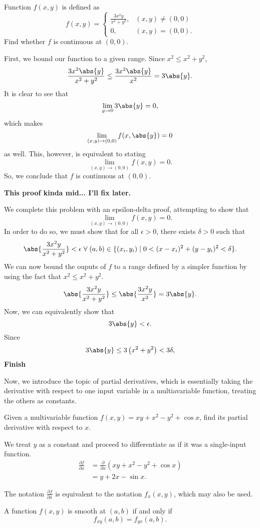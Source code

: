 \begin{example}
    Function $f(x, y)$ is defined as
    \[f(x, y) = \begin{cases}
        \frac{3x^{2}y}{x^{2} + y^{2}}, & (x, y) \neq (0, 0) \\
        0, & (x, y) = (0, 0).
    \end{cases}\]
    Find whether $f$ is continuous at $(0, 0)$.

    \begin{soln}
        First, we bound our function to a given range. Since $x^{2} \leq x^{2} + y^{2}$,
        \[\frac{3x^{2}\abs{y}}{x^{2} + y^{2}} \leq \frac{3x^{2}\abs{y}}{x^{2}} = 3\abs{y}.\]
        It is clear to see that
        \[\lim_{y \to 0} 3\abs{y} = 0,\]
        which makes
        \[\lim_{(x, y) \to (0, 0)} f(x, \abs{y}) = 0\]
        as well. This, however, is equivalent to stating
        \[\lim_{(x, y) \to (0, 0)} f(x, y) = 0.\]
        So, we conclude that $f$ is continuous at $(0, 0)$.

        \textbf{This proof kinda mid... I'll fix later.}

        We complete this problem with an epsilon-delta proof, attempting to show that
        \[\lim_{(x, y) \to (0, 0)} f(x, y) = 0.\]
        In order to do so, we must show that for all $\epsilon > 0$, there exists $\delta > 0$ such that
        \[\abs{\frac{3x^{2}y}{x^{2} + y^{2}}} < \epsilon \sforall (a, b) \in \{(x_{i}, y_{i}) \mid 0 < (x - x_{i})^{2} + (y - y_{i})^{2} < \delta\}.\]
        We can now bound the ouputs of $f$ to a range defined by a simpler function by using the fact that $x^{2} \leq x^{2} + y^{2}$.
        \[\abs{\frac{3x^{2}y}{x^{2} + y^{2}}} \leq \abs{\frac{3x^{2}y}{x^{2}}} = 3\abs{y}.\]
        Now, we can equivalently show that
        \[3\abs{y} < \epsilon.\]
        Since
        \[3\abs{y} \leq 3\left(x^{2} + y^{2}\right) < 3\delta,\]
        \textbf{Finish}
    \end{soln}
\end{example}

Now, we introduce the topic of partial derivatives, which is essentially taking the derivative with respect to one input variable in a multiavariable function, treating the others as constants.

\begin{example}
    Given a multivariable function $f(x, y) = xy + x^{2} - y^{2} + \cos x$, find its partial derivative with respect to $x$.

    \begin{soln}
        We treat $y$ as a constant and proceed to differentiate as if it was a single-input function.
        \begin{align*}
            \frac{\partial f}{\partial x} &= \frac{\partial}{\partial x}\left(xy + x^{2} - y^{2} + \cos x\right) \\
            &= y + 2x - \sin x.
        \end{align*}
    \end{soln}
\end{example}

\begin{remark}
    The notation $\frac{\partial f}{\partial x}$ is equivalent to the notation $f_{x}(x, y)$, which may also be used.
\end{remark}

\begin{proposition}
    A function $f(x, y)$ is smooth at $(a, b)$ if and only if
    \[f_{xy}(a, b) = f_{yx}(a, b).\]
\end{proposition}